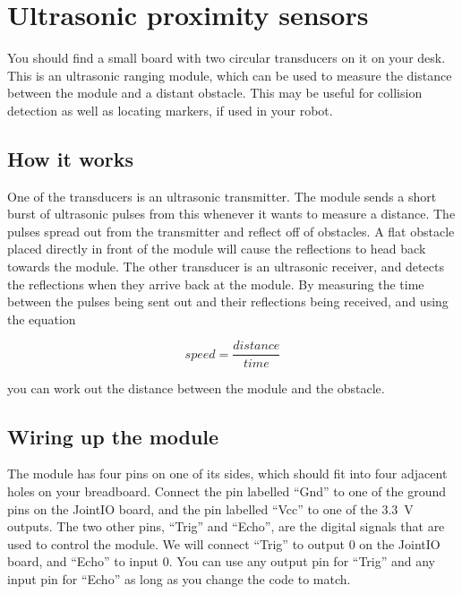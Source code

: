 \documentclass{article}
\begin{document}


\newpage

\section{Ultrasonic proximity sensors}


You should find a small board with two circular transducers on it on your desk.
This is an ultrasonic ranging module, which can be used to measure the distance
between the module and a distant obstacle. This may be useful for collision
detection as well as locating markers, if used in your robot.

\subsection{How it works}

One of the transducers is an ultrasonic transmitter. The module sends a short
burst of ultrasonic pulses from this whenever it wants to measure a distance.
The pulses spread out from the transmitter and reflect off of obstacles. A flat
obstacle placed directly in front of the module will cause the reflections to
head back towards the module. The other transducer is an ultrasonic receiver,
and detects the reflections when they arrive back at the module. By measuring
the time between the pulses being sent out and their reflections being received,
and using the equation

\begin{equation*}
speed = \frac{distance}{time}
\end{equation*}

you can work out the distance between the module and the obstacle.

\subsection{Wiring up the module}

The module has four pins on one of its sides, which should fit into four
adjacent holes on your breadboard. Connect the pin labelled ``Gnd'' to one of
the ground pins on the JointIO board, and the pin labelled ``Vcc'' to one of the
\SI{3.3}{\volt} outputs. The two other pins, ``Trig'' and ``Echo'', are the
digital signals that are used to control the module. We will connect ``Trig''
to output 0 on the JointIO board, and ``Echo'' to input 0. You can use any
output pin for ``Trig'' and any input pin for ``Echo'' as long as you change the
code to match.

\end{document}
